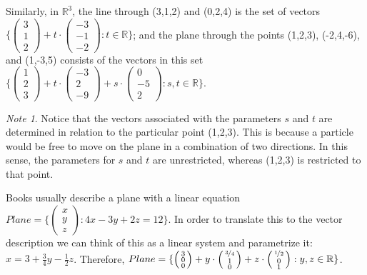 \documentclass[11pt]{amsart} %
\theoremstyle{plain}
\theoremstyle{definition}
\theoremstyle{definition}
\theoremstyle{remark}
\newtheorem*{note}{Note}
\theoremstyle{definition}
\begin{document}
\medskip
Similarly, in $\mathbb{R}^{3}$, the line through (3,1,2) and (0,2,4) is the set of vectors $\{ \left( \begin{smallmatrix}3 \\ 1 \\ 2\end{smallmatrix} \right) + t\cdot \left( \begin{smallmatrix}-3 \\ -1 \\ -2\end{smallmatrix} \right) : t\in\mathbb{R} \}$; and the plane through the points (1,2,3), (-2,4,-6), and (1,-3,5) consists of the vectors in this set $\{ \left( \begin{smallmatrix} 1 \\ 2 \\ 3 \end{smallmatrix} \right) + t \cdot \left( \begin{smallmatrix} -3 \\ 2 \\ -9 \end{smallmatrix} \right) + s \cdot \left( \begin{smallmatrix} 0 \\ -5 \\ 2 \end{smallmatrix} \right) : s,t\in\mathbb{R} \}$.

\begin{note}
Notice that the vectors associated with the parameters $s$ and $t$ are determined in relation to the particular point (1,2,3). This is because a particle would be free to move on the plane in a combination of two directions. In this sense, the parameters for $s$ and $t$ are unrestricted, whereas (1,2,3) is restricted to that point.
\end{note}

\medskip
Books usually describe a plane with a linear equation $Plane = \{ \left( \begin{smallmatrix} x \\ y \\ z \end{smallmatrix} \right) : 4x -  3y + 2z = 12 \}$. In order to translate this to the vector description we can think of this as a linear system and parametrize it: $x = 3 + \frac{3}{4}y - \frac{1}{2}z$. Therefore, $Plane = \{ \left( \begin{smallmatrix} 3 \\ 0 \\ 0 \end{smallmatrix} \right) + y \cdot \left( \begin{smallmatrix} \nicefrac{3}{4} \\ 1 \\ 0 \end{smallmatrix} \right) + z \cdot \left( \begin{smallmatrix} \nicefrac{1}{2} \\ 0 \\ 1 \end{smallmatrix} \right) : y,z\in\mathbb{R} \}$.
\end{document}
